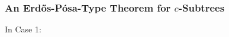 \documentclass{beamer}
\begin{document}
\begin{frame}
  \frametitle{An Erdős-Pósa-Type Theorem for $c$-Subtrees}

  In Case 1:\\

\end{frame}
\end{document}
